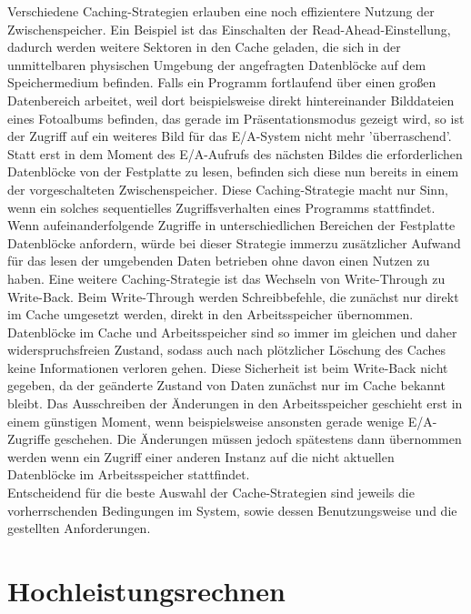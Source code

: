 \documentclass[
	12pt,
	a4paper,
	BCOR10mm,
	DIV14,
	listof=totoc,
	bibliography=totoc,
	headsepline
]{scrreprt}
\begin{document}
Verschiedene Caching-Strategien erlauben eine noch effizientere Nutzung der Zwischenspeicher.
Ein Beispiel ist das Einschalten der Read-Ahead-Einstellung, dadurch werden weitere Sektoren in den Cache geladen, die sich in der unmittelbaren physischen Umgebung der angefragten Datenblöcke auf dem  Speichermedium befinden. Falls ein Programm fortlaufend über einen großen Datenbereich arbeitet, weil dort beispielsweise direkt hintereinander Bilddateien eines Fotoalbums befinden, das gerade im Präsentationsmodus gezeigt wird, so ist der Zugriff auf ein weiteres Bild für das E/A-System nicht mehr 'überraschend'. Statt erst in dem Moment des E/A-Aufrufs des nächsten Bildes die erforderlichen Datenblöcke von der Festplatte zu lesen, befinden sich diese nun bereits in einem der vorgeschalteten Zwischenspeicher. Diese Caching-Strategie macht nur Sinn, wenn ein solches sequentielles Zugriffsverhalten eines Programms stattfindet. 
Wenn aufeinanderfolgende Zugriffe in unterschiedlichen Bereichen der Festplatte Datenblöcke anfordern, würde bei dieser Strategie immerzu zusätzlicher Aufwand für das lesen der umgebenden Daten betrieben ohne davon einen Nutzen zu haben. 
Eine weitere Caching-Strategie ist das Wechseln von Write-Through zu Write-Back. Beim Write-Through werden Schreibbefehle, die zunächst nur direkt im Cache umgesetzt werden, direkt in den Arbeitsspeicher übernommen. Datenblöcke im Cache und Arbeitsspeicher sind so immer im gleichen und daher widerspruchsfreien Zustand, sodass auch nach plötzlicher Löschung des Caches keine Informationen verloren gehen.
Diese Sicherheit ist beim Write-Back nicht gegeben, da der geänderte Zustand von Daten zunächst nur im Cache bekannt bleibt. Das Ausschreiben der Änderungen in den Arbeitsspeicher geschieht erst in einem günstigen Moment, wenn beispielsweise ansonsten gerade wenige E/A-Zugriffe geschehen. Die Änderungen müssen jedoch spätestens dann übernommen werden wenn ein Zugriff einer anderen Instanz auf die nicht aktuellen Datenblöcke im Arbeitsspeicher stattfindet.\\
Entscheidend für die beste Auswahl der Cache-Strategien sind jeweils die vorherrschenden Bedingungen im System, sowie dessen Benutzungsweise und die gestellten Anforderungen.

\section{Hochleistungsrechnen}
\end{document}
